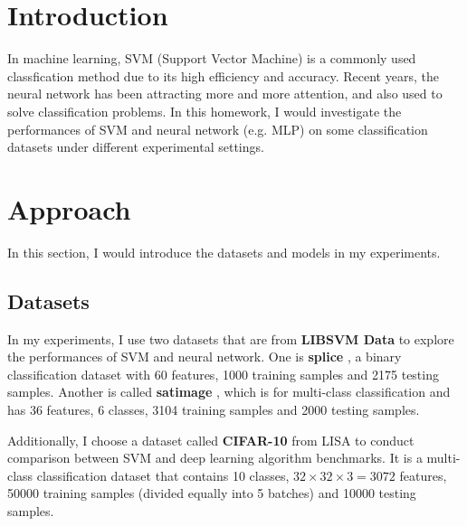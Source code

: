 \documentclass[12pt,a4paper]{article}
\theoremstyle{definition}
\begin{document}
\noindent
\noindent{}

\section{Introduction}

In machine learning, SVM (Support Vector Machine) is a commonly used classfication method due to its high efficiency and accuracy. Recent years, the neural network has been attracting more and more attention, and also used to solve classification problems. In this homework, I would investigate the performances of SVM and neural network (e.g. MLP) on some classification datasets under different experimental settings.

\section{Approach}

In this section, I would introduce the datasets and models in my experiments.

\subsection{Datasets}

In my experiments, I use two datasets that are from \textbf{LIBSVM Data} \cite{dataA} to explore the performances of SVM and neural network. One is \textbf{splice} \cite{splice}, a binary classification dataset with 60 features, 1000 training samples and 2175 testing samples. Another is called \textbf{satimage} \cite{satimage}, which is for multi-class classification and has 36 features, 6 classes, 3104 training samples and 2000 testing samples.

\vspace{0.01\linewidth}
Additionally, I choose a dataset called \textbf{CIFAR-10} \cite{cifar-10} from LISA \cite{dataB} to conduct comparison between SVM and deep learning algorithm benchmarks. It is a multi-class classification dataset that contains 10 classes, $32 \times 32 \times 3 = 3072$ features, 50000 training samples (divided equally into 5 batches) and 10000 testing samples.
\end{document}
